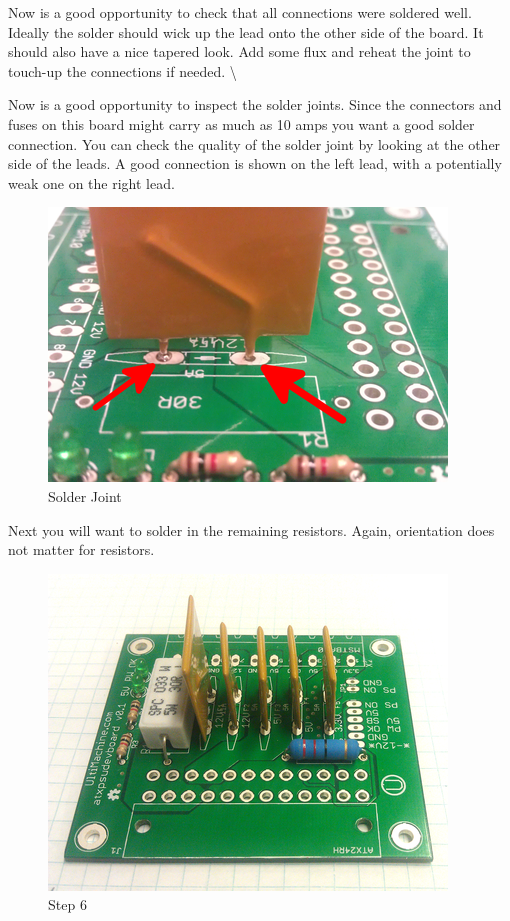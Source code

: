 Now is a good opportunity to check that all connections were soldered
well. Ideally the solder should wick up the lead onto the other side of
the board. It should also have a nice tapered look. Add some flux and
reheat the joint to touch-up the connections if needed. \textbackslash{}

Now is a good opportunity to inspect the solder joints. Since the
connectors and fuses on this board might carry as much as 10 amps you
want a good solder connection. You can check the quality of the solder
joint by looking at the other side of the leads. A good connection is
shown on the left lead, with a potentially weak one on the right lead.

\begin{figure}[htbp]
\centering
\includegraphics{./png/solder-joint.png}
\caption{Solder Joint}
\end{figure}

Next you will want to solder in the remaining resistors. Again,
orientation does not matter for resistors.

\begin{figure}[htbp]
\centering
\includegraphics{./png/step-06.png}
\caption{Step 6}
\end{figure}

